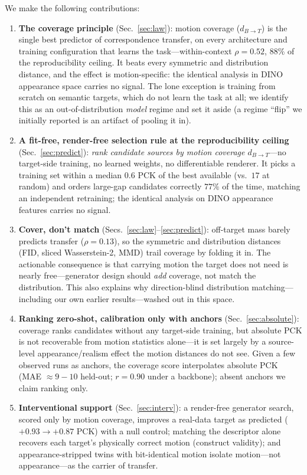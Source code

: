 \documentclass[runningheads]{llncs}
\newcommand{\dbt}{d_{B\to T}}
\newcommand{\pck}{PCK}
\begin{document}
We make the following contributions:
\begin{enumerate}
\item \textbf{The coverage principle} (Sec.~\ref{sec:law}): motion coverage
  ($\dbt$) is the single best predictor of correspondence transfer, on every
  architecture and training configuration that learns the task---within-context
  $\rho{=}0.52$, $88\%$ of the reproducibility ceiling. It beats every symmetric
  and distribution distance, and the effect is motion-specific: the identical
  analysis in DINO appearance space carries no signal. The lone exception is
  training from scratch on semantic targets, which do not learn the task at all;
  we identify this as an out-of-distribution \emph{model} regime and set it aside
  (a regime ``flip'' we initially reported is an artifact of pooling it in).
\item \textbf{A fit-free, render-free selection rule at the reproducibility
  ceiling} (Sec.~\ref{sec:predict}): \emph{rank candidate sources by motion
  coverage $\dbt$}---no target-side training, no learned weights, no
  differentiable renderer. It picks a training set within a median $0.6$ \pck{}
  of the best available (vs.\ $17$ at random) and orders large-gap candidates
  correctly $77\%$ of the time, matching an independent retraining; the identical
  analysis on DINO appearance features carries no signal.
\item \textbf{Cover, don't match}
  (Secs.~\ref{sec:law}--\ref{sec:predict}): off-target mass barely predicts
  transfer ($\rho{=}0.13$), so the symmetric and distribution distances (FID,
  sliced Wasserstein-2, MMD) trail coverage by folding it in. The actionable
  consequence is that carrying motion the target does not need is nearly
  free---generator design should \emph{add} coverage, not match the
  distribution. This also explains why direction-blind distribution
  matching---including our own earlier results---washed out in this space.
\item \textbf{Ranking zero-shot, calibration only with anchors}
  (Sec.~\ref{sec:absolute}): coverage ranks candidates without any target-side
  training, but absolute \pck{} is not recoverable from motion statistics
  alone---it is set largely by a source-level appearance/realism effect the
  motion distances do not see. Given a few observed runs as anchors, the
  coverage score interpolates absolute \pck{} (MAE ${\approx}9{-}10$ held-out;
  $r{=}0.90$ under a backbone); absent anchors we claim ranking only.
\item \textbf{Interventional support} (Sec.~\ref{sec:interv}): a render-free
  generator search, scored only by motion coverage, improves a real-data target
  as predicted ($+0.93{\to}+0.87$ \pck{}) with a null control; matching the
  descriptor alone recovers each target's physically correct motion (construct
  validity); and appearance-stripped twins with bit-identical motion isolate
  motion---not appearance---as the carrier of transfer.
\end{enumerate}
\end{document}
